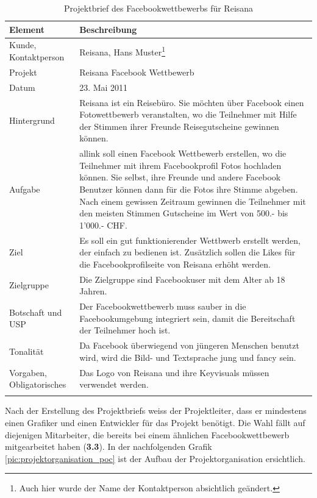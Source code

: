 \begin{longtable}{lp{10cm}}
    \toprule \textbf{Element} & \textbf{Beschreibung} \\
    \midrule Kunde, Kontaktperson &
        Reisana, Hans Muster\footnote{Auch hier wurde der Name der Kontaktperson
        absichtlich geändert.} \\
    \midrule Projekt &
        Reisana Facebook Wettbewerb \\
    \midrule Datum &
        23. Mai 2011 \\
    \midrule Hintergrund &
        Reisana ist ein Reisebüro. Sie möchten über Facebook einen Fotowettbewerb
        veranstalten, wo die Teilnehmer mit Hilfe der Stimmen ihrer Freunde 
        Reisegutscheine gewinnen können. \\
    \midrule Aufgabe &
        allink soll einen Facebook Wettbewerb erstellen, wo die Teilnehmer mit
        ihrem Facebookprofil Fotos hochladen können. Sie selbst, ihre Freunde
        und andere Facebook Benutzer können dann für die Fotos ihre Stimme abgeben.
        Nach einem gewissen Zeitraum gewinnen die Teilnehmer mit den meisten 
        Stimmen Gutscheine im Wert von 500.- bis 1'000.- CHF. \\
    \midrule Ziel &
        Es soll ein gut funktionierender Wettbwerb erstellt werden, der einfach
        zu bedienen ist. Zusätzlich sollen die Likes für die Facebookprofilseite von
        Reisana erhöht werden. \\
    \midrule Zielgruppe &
        Die Zielgruppe sind Facebookuser mit dem Alter ab 18 Jahren. \\
    \midrule Botschaft und USP &
        Der Facebookwettbewerb muss sauber in die Facebookumgebung integriert 
        sein, damit die Bereitschaft der Teilnehmer hoch ist. \\
    \midrule Tonalität &
        Da Facebook überwiegend von jüngeren Menschen benutzt wird, wird die
        Bild- und Textsprache jung und fancy sein. \\
    \midrule Vorgaben, Obligatorisches &
        Das Logo von Reisana und ihre Keyvisuals müssen verwendet werden. \\
    \bottomrule
    \caption[Projektbrief des Facebookwettbewerbs für Hotelplan]{Projektbrief des 
        Facebookwettbewerbs für Reisana\footnotemark}
    \label{tab:projektbrief_poc}
\end{longtable}

Nach der Erstellung des Projektbriefs weiss der Projektleiter, dass er mindestens
einen Grafiker und einen Entwickler für das Projekt benötigt. Die Wahl fällt
auf diejenigen Mitarbeiter, die bereits bei einem ähnlichen Facebookwettbewerb
mitgearbeitet haben (\textbf{3.3}). In der nachfolgenden Grafik \ref{pic:projektorganisation_poc} 
ist der Aufbau der Projektorganisation ersichtlich.

